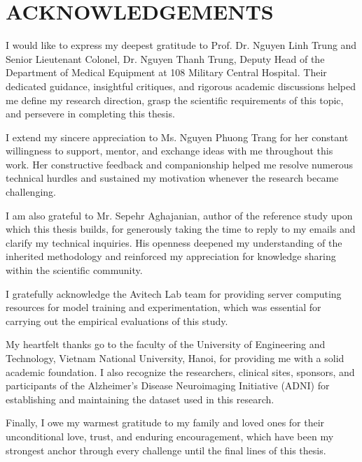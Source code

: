 \chapter*{ACKNOWLEDGEMENTS}

I would like to express my deepest gratitude to Prof. Dr. Nguyen Linh Trung and Senior Lieutenant Colonel, Dr. Nguyen Thanh Trung, Deputy Head of the Department of Medical Equipment at 108 Military Central Hospital. Their dedicated guidance, insightful critiques, and rigorous academic discussions helped me define my research direction, grasp the scientific requirements of this topic, and persevere in completing this thesis.

I extend my sincere appreciation to Ms. Nguyen Phuong Trang for her constant willingness to support, mentor, and exchange ideas with me throughout this work. Her constructive feedback and companionship helped me resolve numerous technical hurdles and sustained my motivation whenever the research became challenging.

I am also grateful to Mr. Sepehr Aghajanian, author of the reference study upon which this thesis builds, for generously taking the time to reply to my emails and clarify my technical inquiries. His openness deepened my understanding of the inherited methodology and reinforced my appreciation for knowledge sharing within the scientific community.

I gratefully acknowledge the Avitech Lab team for providing server computing resources for model training and experimentation, which was essential for carrying out the empirical evaluations of this study.

My heartfelt thanks go to the faculty of the University of Engineering and Technology, Vietnam National University, Hanoi, for providing me with a solid academic foundation. I also recognize the researchers, clinical sites, sponsors, and participants of the Alzheimer's Disease Neuroimaging Initiative (ADNI) for establishing and maintaining the dataset used in this research.

Finally, I owe my warmest gratitude to my family and loved ones for their unconditional love, trust, and enduring encouragement, which have been my strongest anchor through every challenge until the final lines of this thesis.
